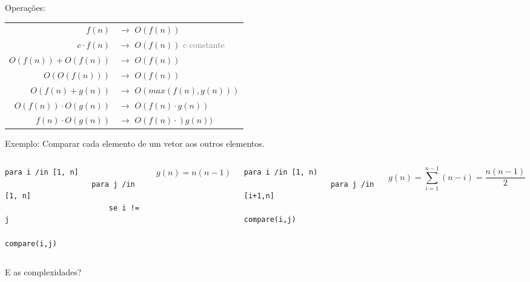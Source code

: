 \begin{frame}[label=graduacao]
	Operações:\\\vfill
	\begin{center}
		\begin{tabular}{rl}
			$f(n)$ 					& $\rightarrow$  $O(f(n))$\\
			$c{\cdot}f(n)$ 			& $\rightarrow$  $O(f(n))$ \textcolor{gray}{c constante}\\
			$O(f(n)) + O(f(n))$ 	& $\rightarrow$  $O(f(n))$\\
			$O(O(f(n)))$ 			& $\rightarrow$  $O(f(n))$\\
			$O(f(n) + g(n))$ 		& $\rightarrow$  $O(max(f(n),g(n)))$\\
			$O(f(n)){\cdot}O(g(n))$ & $\rightarrow$  $O(f(n){\cdot}g(n))$\\
			$f(n){\cdot}O(g(n))$ 	& $\rightarrow$  $O(f(n){\cdot})g(n))$\\
		\end{tabular}
	\end{center}
\end{frame}

\begin{frame}[fragile,label=main]
	Exemplo: Comparar cada elemento de um vetor aos outros elementos.
	\begin{columns}[T]
			\begin{lstlisting}[title=Algoritmo,morekeywords={compare}]
				para i /in [1, n]
				    para j /in [1, n]
				        se i != j
				            compare(i,j)
			\end{lstlisting}
			\pause
			$g(n) = n(n-1)$
			\begin{lstlisting}[title= Algoritmo Otimizado,morekeywords={compare}]
				para i /in [1, n)
				    para j /in [i+1,n]
				        compare(i,j)
			\end{lstlisting}
			\pause
			$$g(n) = \sum_{i=1}^{n-1}(n-i) = \frac{n(n-1)}{2}$$
	\end{columns}
	\vfill
	E as complexidades?	
\end{frame}

